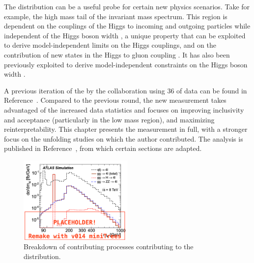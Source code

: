 The \mFourL{} distribution can be a useful probe for certain new physics scenarios. Take for example, the high mass tail of the invariant mass spectrum. This region is dependent on the couplings of the Higgs to incoming and outgoing particles while independent of the Higgs boson width \cite{Campbell_2016}, a unique property that can be exploited to derive model-independent limits on the Higgs couplings, and on the  contribution of new states in the Higgs to gluon coupling \cite{Cacciapaglia_2014}. It has also been previously exploited to derive model-independent constraints on the Higgs boson width \cite{Caola_2013}. 

A previous iteration of the \mFourL{} by the \ATLAS collaboration using \unit{36}{\invfb} of data can be found in Reference~\cite{Aaboud:2019lxo}. Compared to the previous round, the new \mFourL{} measurement takes advantaged of the increased data statistics and focuses on improving inclusivity and acceptance (particularly in the low mass region), and maximizing reinterpretability. This chapter presents the measurement in full, with a stronger focus on the unfolding studies on which the author contributed. The analysis is published in Reference~\cite{m4l2021_paper}, from which certain sections are adapted.

\begin{figure}
    \centering
    \includegraphics[width=0.5\textwidth]{Figures/m4l/m4lbreakdown.png}
    \caption{Breakdown of contributing processes contributing to the \mFourL{} distribution.}
    \label{fig:m4lbreakdown}
\end{figure}

